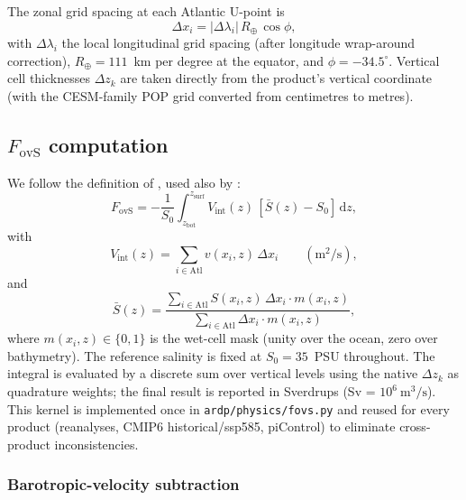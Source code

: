 \documentclass[11pt,a4paper]{article}
\newcommand{\Fovs}{F_\mathrm{ovS}}
\begin{document}
The zonal grid spacing at each Atlantic U-point is
\begin{equation}
\Delta x_i = |\Delta\lambda_i|\, R_\oplus\, \cos\phi,
\end{equation}
with $\Delta\lambda_i$ the local longitudinal grid spacing (after longitude wrap-around correction), $R_\oplus = 111$~km per degree at the equator, and $\phi = -34.5^\circ$. Vertical cell thicknesses $\Delta z_k$ are taken directly from the product's vertical coordinate (with the CESM-family POP grid converted from centimetres to metres).

\subsection*{$\Fovs$ computation}

We follow the definition of \citet{deVriesWeber2005}, used also by \citet{Dijkstra2007, Drijfhout2011, vanWesten2024}:
\begin{equation}
\Fovs = -\frac{1}{S_0}\int_{z_\mathrm{bot}}^{z_\mathrm{surf}}
  V_\mathrm{int}(z)\,[\bar{S}(z) - S_0]\,\mathrm{d}z,
\end{equation}
with
\begin{equation}
V_\mathrm{int}(z) = \sum_{i\in\mathrm{Atl}} v(x_i, z)\,\Delta x_i \qquad(\mathrm{m}^2/\mathrm{s}),
\end{equation}
and
\begin{equation}
\bar{S}(z) = \frac{\sum_{i\in\mathrm{Atl}} S(x_i, z)\,\Delta x_i
                  \cdot m(x_i, z)}
                 {\sum_{i\in\mathrm{Atl}} \Delta x_i \cdot m(x_i, z)},
\end{equation}
where $m(x_i, z)\in\{0, 1\}$ is the wet-cell mask (unity over the ocean, zero over bathymetry). The reference salinity is fixed at $S_0 = 35$~PSU throughout. The integral is evaluated by a discrete sum over vertical levels using the native $\Delta z_k$ as quadrature weights; the final result is reported in Sverdrups (Sv = $10^6~\mathrm{m}^3/\mathrm{s}$). This kernel is implemented once in \texttt{ardp/physics/fovs.py} and reused for every product (reanalyses, CMIP6 historical/ssp585, piControl) to eliminate cross-product inconsistencies.

\subsubsection*{Barotropic-velocity subtraction}
\end{document}
